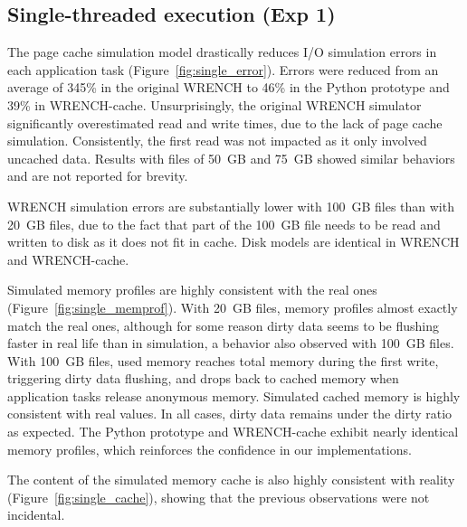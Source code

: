 \documentclass[conference]{IEEEtran}
\newcommand{\wrench}{WRENCH\xspace}
\begin{document}
        \subsection{Single-threaded execution (Exp 1)}


        The page cache simulation model drastically reduces I/O simulation
        errors in each application task (Figure~\ref{fig:single_error}). Errors were reduced from an average
        of 345\% in the original \wrench to 46\% in the Python prototype and
        39\% in \wrench-cache. Unsurprisingly, the original \wrench simulator
        significantly overestimated read and write times, due to the lack
        of page cache simulation. Consistently, the first read was not impacted
        as it only involved uncached data. Results with files of 50~GB and 75~GB
        showed similar behaviors and are not reported for brevity.

        \wrench simulation errors are substantially lower with 100~GB
        files than with 20~GB files, due to the fact that part of the
        100~GB file needs to be read and written to disk as it does not fit in cache. Disk models are
        identical in WRENCH and WRENCH-cache.

        Simulated memory profiles are highly consistent with the real ones
        (Figure~\ref{fig:single_memprof}). With 20~GB files, memory profiles almost exactly match the
        real ones, although for some reason dirty data seems to be flushing faster in real
        life than in simulation, a behavior also
        observed with 100~GB files. With 100~GB files, used memory reaches
        total memory during the first write, triggering dirty data
        flushing, and drops back to cached memory when application tasks
        release anonymous memory. Simulated cached memory is highly
        consistent with real values. In all cases, dirty data remains under the dirty ratio as
        expected. The Python prototype and \wrench-cache exhibit nearly
        identical memory profiles, which reinforces the confidence in our
        implementations.

        The content of the simulated memory cache is also highly consistent
        with reality (Figure~\ref{fig:single_cache}), showing that the
        previous observations were not incidental.
\end{document}
